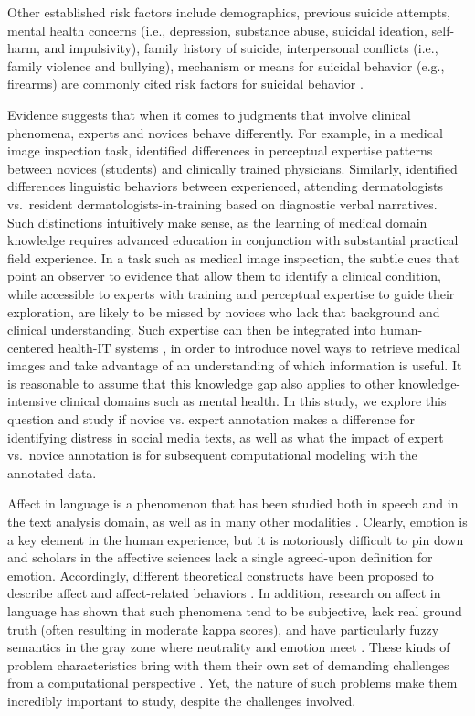 \documentclass[11pt]{article}
\begin{document}
Other established risk factors include demographics, previous suicide attempts, mental health concerns (i.e., depression, substance abuse, suicidal ideation, self-harm, and impulsivity), family history of suicide, interpersonal conflicts (i.e., family violence and bullying), mechanism or means for suicidal behavior (e.g., firearms)  are commonly cited risk factors for suicidal behavior \cite{nock2008suicide,crosby2011self,gaynes2004screening,harriss2005suicidal,shaffer2004columbia,shaffer2004columbia,brown2000risk}. 




Evidence suggests that when it comes to judgments that involve clinical phenomena, experts and novices behave differently. For example, in a medical image inspection task,  identified differences in perceptual expertise patterns between novices (students) and clinically trained physicians. Similarly,  identified  differences linguistic behaviors between experienced, attending dermatologists vs.\ resident dermatologists-in-training based on diagnostic verbal narratives. Such distinctions intuitively make sense, as the learning of medical domain knowledge requires advanced education in conjunction with substantial practical field experience. In a task such as medical image inspection, the subtle cues that point an observer to evidence that allow them to identify a clinical condition, while accessible to experts with training and perceptual expertise to guide their exploration, are likely to be missed by novices who lack that background and clinical understanding. Such expertise can then be integrated into human-centered health-IT systems \cite{guo2014infusing}, in order to introduce novel ways to retrieve medical images and take advantage of an understanding of which information is useful. It is reasonable to assume that this knowledge gap also applies to other knowledge-intensive clinical domains such as mental health. In this study, we explore this question and study if novice vs. expert annotation makes a difference for identifying distress in social media texts, as well as what the impact of expert vs.\ novice annotation is for subsequent computational modeling with the annotated data.


Affect in language is a phenomenon that has been studied both in speech and in the text analysis domain, as well as in many other modalities \cite{calvodmello2010}. Clearly, emotion is a key element in the human experience, but it is notoriously difficult to pin down and scholars in the affective sciences lack a single agreed-upon definition for emotion. Accordingly, different theoretical constructs have been proposed to describe affect and affect-related behaviors \cite{picard1997}. In addition, research on affect in language has shown that such phenomena tend to be subjective, lack real ground truth (often resulting in moderate kappa scores), and have particularly fuzzy semantics in the gray zone where neutrality and emotion meet \cite{alm08}. These kinds of problem characteristics bring with them their own set of demanding challenges from a computational perspective \cite{alm2011}. Yet, the nature of such problems make them incredibly important to study, despite the challenges involved. 
\end{document}
